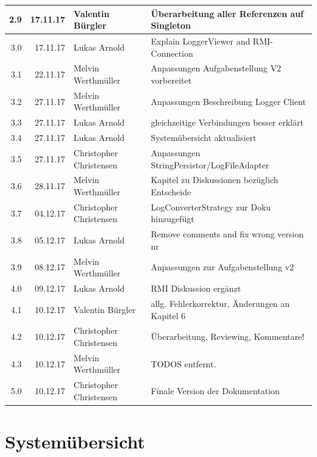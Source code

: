 \documentclass[12pt,a4paper,twosided]{scrartcl}
\begin{document}
\begin{center}
\begin{tabularx}{\textwidth}{|r|r|l|X|}
		2.9  & 17.11.17 & Valentin Bürgler        & Überarbeitung aller Referenzen auf Singleton   \\ \hline
		3.0  & 17.11.17 & Lukas Arnold            & Explain LoggerViewer and RMI-Connection        \\ \hline
		3.1  & 22.11.17 & Melvin Werthmüller      & Anpassungen Aufgabenstellung V2 vorbereitet    \\ \hline
		3.2  & 27.11.17 & Melvin Werthmüller      & Anpassungen Beschreibung Logger Client         \\ \hline
		3.3  & 27.11.17 & Lukas Arnold            & gleichzeitige Verbindungen besser erklärt      \\ \hline
		3.4  & 27.11.17 & Lukas Arnold            & Systemübersicht aktualisiert                   \\ \hline
		3.5  & 27.11.17 & Christopher Christensen & Anpassungen StringPersistor/LogFileAdapter     \\ \hline
		3.6  & 28.11.17 & Melvin Werthmüller      & Kapitel zu Diskussionen bezüglich Entscheide   \\ \hline
		3.7  & 04.12.17 & Christopher Christensen & LogConverterStrategy zur Doku hinzugefügt      \\ \hline
		3.8  & 05.12.17 & Lukas Arnold            & Remove comments and fix wrong version nr   \\ \hline
		3.9  & 08.12.17 & Melvin Werthmüller      & Anpassungen zur Aufgabenstellung v2            \\ \hline
		4.0  & 09.12.17 & Lukas Arnold            & RMI Diskussion ergänzt                         \\ \hline
		4.1  & 10.12.17 & Valentin Bürgler        & allg. Fehlerkorrektur, Änderungen an Kapitel 6 \\ \hline
		4.2  & 10.12.17 & Christopher Christensen & Überarbeitung, Reviewing, Kommentare!          \\ \hline
		4.3  & 10.12.17 & Melvin Werthmüller      & TODOS entfernt.                                \\ \hline
		5.0  & 10.12.17 & Christopher Christensen & Finale Version der Dokumentation               \\ \hline
	\end{tabularx}
\end{center}

\newpage
\tableofcontents
\newpage

\section{Systemübersicht}
\end{document}
